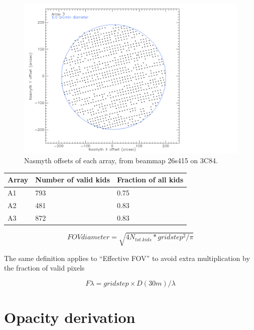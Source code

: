 \documentclass[a4paper, 11pt]{article} %
\begin{document}
\begin{figure}
\begin{center}
\includegraphics[clip, angle=0, scale = 0.15]{Figures/FOV_A3.png}
\caption{Nasmyth offsets of each array, from beammap 26s415 on 3C84.}
\label{fig:fov}
\end{center}
\end{figure}

\begin{table}
\begin{tabular}{|l|l|l|}
\hline
Array & Number of valid kids & Fraction of all kids\\
\hline
A1 & 793 & 0.75\\
A2 & 481 & 0.83\\
A3 & 872 & 0.83\\
\hline
\end{tabular}
\end{table}

\begin{equation}
FOV diameter = \sqrt{4 N_{tot. kids} * gridstep^2/\pi}
\end{equation}

The same definition applies to ``Effective FOV'' to avoid extra multiplication
by the fraction of valid pixels

\begin{equation}
F\lambda = gridstep\times D(30m)/\lambda
\end{equation}

\section{Opacity derivation}
\label{se:opacities}
\end{document}
